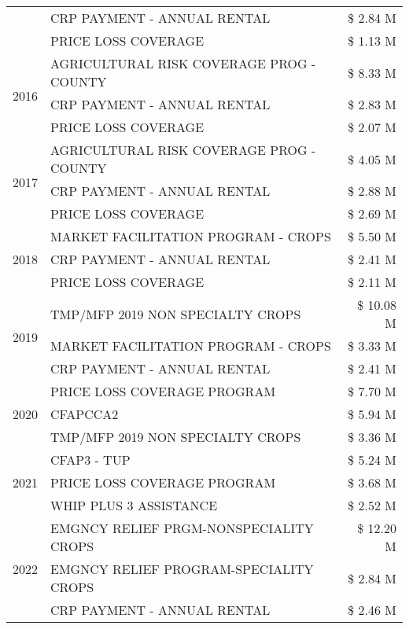 \begin{tabular}{llr}
 & CRP PAYMENT - ANNUAL RENTAL & \$ 2.84 M \\
 & PRICE LOSS COVERAGE & \$ 1.13 M \\
\cline{1-3}
\multirow[t]{3}{*}{2016} & AGRICULTURAL RISK COVERAGE PROG - COUNTY & \$ 8.33 M \\
 & CRP PAYMENT - ANNUAL RENTAL & \$ 2.83 M \\
 & PRICE LOSS COVERAGE & \$ 2.07 M \\
\cline{1-3}
\multirow[t]{3}{*}{2017} & AGRICULTURAL RISK COVERAGE PROG - COUNTY & \$ 4.05 M \\
 & CRP PAYMENT - ANNUAL RENTAL & \$ 2.88 M \\
 & PRICE LOSS COVERAGE & \$ 2.69 M \\
\cline{1-3}
\multirow[t]{3}{*}{2018} & MARKET FACILITATION PROGRAM - CROPS & \$ 5.50 M \\
 & CRP PAYMENT - ANNUAL RENTAL & \$ 2.41 M \\
 & PRICE LOSS COVERAGE & \$ 2.11 M \\
\cline{1-3}
\multirow[t]{3}{*}{2019} & TMP/MFP 2019 NON SPECIALTY CROPS & \$ 10.08 M \\
 & MARKET FACILITATION PROGRAM - CROPS & \$ 3.33 M \\
 & CRP PAYMENT - ANNUAL RENTAL & \$ 2.41 M \\
\cline{1-3}
\multirow[t]{3}{*}{2020} & PRICE LOSS COVERAGE PROGRAM & \$ 7.70 M \\
 & CFAPCCA2 & \$ 5.94 M \\
 & TMP/MFP 2019 NON SPECIALTY CROPS & \$ 3.36 M \\
\cline{1-3}
\multirow[t]{3}{*}{2021} & CFAP3 - TUP & \$ 5.24 M \\
 & PRICE LOSS COVERAGE PROGRAM & \$ 3.68 M \\
 & WHIP PLUS 3 ASSISTANCE & \$ 2.52 M \\
\cline{1-3}
\multirow[t]{3}{*}{2022} & EMGNCY RELIEF PRGM-NONSPECIALITY CROPS & \$ 12.20 M \\
 & EMGNCY RELIEF PROGRAM-SPECIALITY CROPS & \$ 2.84 M \\
 & CRP PAYMENT - ANNUAL RENTAL & \$ 2.46 M \\
\cline{1-3}
\bottomrule
\end{tabular}
